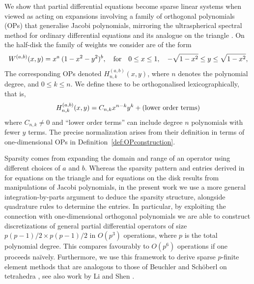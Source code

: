 \documentclass[11pt, oneside]{article}   	%
\newcommand{\sotodoinline}{\todo[color=green,inline=true]}
\newcommand{\hdop}{H}
\newcommand{\hdopnkab}{\hdop_{n,k}^{(a,b)}}
\begin{document}
We show that partial differential equations become sparse linear systems when viewed as acting on expansions involving a family of orthogonal polynomials (OPs) that  generalise Jacobi polynomials, mirroring the ultraspherical spectral method for ordinary differential equations \cite{olver2013fast} and its analogue on the triangle \cite{olver2018recurrence,olver2019triangle}.  On the half-disk the family of weights we consider are of the form
$$
W^{(a,b)}(x,y) = x^a \: (1-x^2-y^2)^b, \quad\hbox{for}\quad 0 \leq x \leq 1,\quad -\sqrt{1-x^2} \leq y \leq \sqrt{1-x^2},
$$
The corresponding OPs denoted $\hdopnkab(x,y)$, where $n$ denotes the polynomial degree, and $0 \le k \le n$. We define these to be orthogonalised lexicographically, that is,
$$
\hdopnkab(x,y) = C_{n,k} x^{n-k} y^k + (\hbox{lower order terms})
$$
where $C_{n,k} \neq 0$ and ``lower order terms'' can  include degree $n$ polynomials with fewer $y$ terms. The precise normalization arises from their definition in terms of one-dimensional OPs in Definition~\ref{def:OPconstruction}. 

Sparsity comes from expanding the domain and range of an operator  using different choices of $a$ and $b$. Whereas the sparsity pattern and entries derived in \cite{olver2018recurrence,olver2019triangle} for equations on the triangle  and \cite{vasil2016tensor} for equations on the disk results from manipulations of Jacobi polynomials, in the present work we use a more general integration-by-parts argument to deduce the sparsity structure, alongside quadrature rules to determine the entries.  In particular, by exploiting the connection with one-dimensional orthogonal polynomials we are able to construct discretizations of general partial differential operators of size $p(p-1)/2 \times p(p-1)/2$ in $O(p^3)$ operations, where $p$ is the total polynomial degree. This compares favourably to $O(p^6)$ operations if one proceeds na\"ively. Furthermore, we use this framework to derive sparse $p$-finite element methods that are analogous to those of Beuchler and Sch\"oberl on tetrahedra \cite{beuchler2006new}, see also work by Li and Shen \cite{li2010optimal}.  


\end{document}
